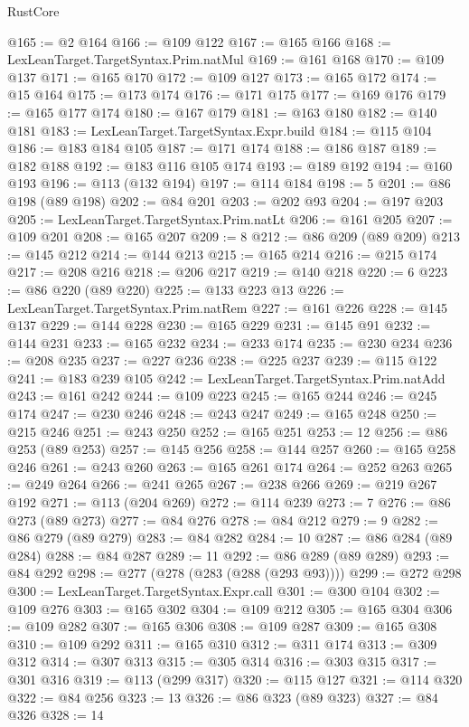 \begin{lexlean}{RustCore}
\begin{coremodule}
@165 := @2 @164
@166 := @109 @122
@167 := @165 @166
@168 := LexLeanTarget.TargetSyntax.Prim.natMul
@169 := @161 @168
@170 := @109 @137
@171 := @165 @170
@172 := @109 @127
@173 := @165 @172
@174 := @15 @164
@175 := @173 @174
@176 := @171 @175
@177 := @169 @176
@179 := @165 @177 @174
@180 := @167 @179
@181 := @163 @180
@182 := @140 @181
@183 := LexLeanTarget.TargetSyntax.Expr.build
@184 := @115 @104
@186 := @183 @184 @105
@187 := @171 @174
@188 := @186 @187
@189 := @182 @188
@192 := @183 @116 @105 @174
@193 := @189 @192
@194 := @160 @193
@196 := @113 (@132 @194)
@197 := @114 @184
@198 := 5
@201 := @86 @198 (@89 @198)
@202 := @84 @201
@203 := @202 @93
@204 := @197 @203
@205 := LexLeanTarget.TargetSyntax.Prim.natLt
@206 := @161 @205
@207 := @109 @201
@208 := @165 @207
@209 := 8
@212 := @86 @209 (@89 @209)
@213 := @145 @212
@214 := @144 @213
@215 := @165 @214
@216 := @215 @174
@217 := @208 @216
@218 := @206 @217
@219 := @140 @218
@220 := 6
@223 := @86 @220 (@89 @220)
@225 := @133 @223 @13
@226 := LexLeanTarget.TargetSyntax.Prim.natRem
@227 := @161 @226
@228 := @145 @137
@229 := @144 @228
@230 := @165 @229
@231 := @145 @91
@232 := @144 @231
@233 := @165 @232
@234 := @233 @174
@235 := @230 @234
@236 := @208 @235
@237 := @227 @236
@238 := @225 @237
@239 := @115 @122
@241 := @183 @239 @105
@242 := LexLeanTarget.TargetSyntax.Prim.natAdd
@243 := @161 @242
@244 := @109 @223
@245 := @165 @244
@246 := @245 @174
@247 := @230 @246
@248 := @243 @247
@249 := @165 @248
@250 := @215 @246
@251 := @243 @250
@252 := @165 @251
@253 := 12
@256 := @86 @253 (@89 @253)
@257 := @145 @256
@258 := @144 @257
@260 := @165 @258 @246
@261 := @243 @260
@263 := @165 @261 @174
@264 := @252 @263
@265 := @249 @264
@266 := @241 @265
@267 := @238 @266
@269 := @219 @267 @192
@271 := @113 (@204 @269)
@272 := @114 @239
@273 := 7
@276 := @86 @273 (@89 @273)
@277 := @84 @276
@278 := @84 @212
@279 := 9
@282 := @86 @279 (@89 @279)
@283 := @84 @282
@284 := 10
@287 := @86 @284 (@89 @284)
@288 := @84 @287
@289 := 11
@292 := @86 @289 (@89 @289)
@293 := @84 @292
@298 := @277 (@278 (@283 (@288 (@293 @93))))
@299 := @272 @298
@300 := LexLeanTarget.TargetSyntax.Expr.call
@301 := @300 @104
@302 := @109 @276
@303 := @165 @302
@304 := @109 @212
@305 := @165 @304
@306 := @109 @282
@307 := @165 @306
@308 := @109 @287
@309 := @165 @308
@310 := @109 @292
@311 := @165 @310
@312 := @311 @174
@313 := @309 @312
@314 := @307 @313
@315 := @305 @314
@316 := @303 @315
@317 := @301 @316
@319 := @113 (@299 @317)
@320 := @115 @127
@321 := @114 @320
@322 := @84 @256
@323 := 13
@326 := @86 @323 (@89 @323)
@327 := @84 @326
@328 := 14

\end{coremodule}
\end{lexlean}
